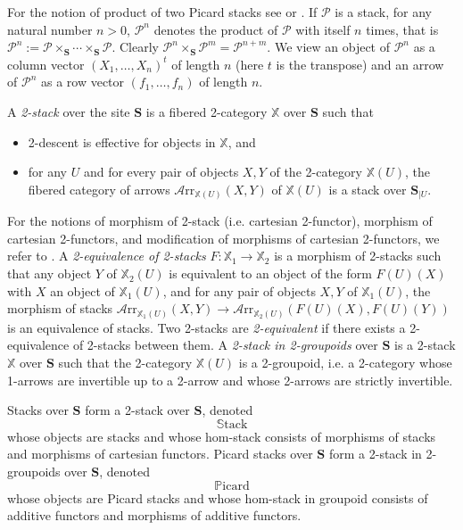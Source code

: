 \documentclass[11pt]{amsart}
\newcommand{\cA}{\mathcal{A}}
\newcommand{\cP}{\mathcal{P}}
\newcommand{\PICARD}{\mathbb{P}\mathrm{icard}}
\newcommand{\STACK}{\mathbb{S}\mathrm{tack}}
\newcommand{\bS}{\textbf{S}}
\newcommand{\twoX}{\mathbb{X}}
\theoremstyle{definition}
\numberwithin{equation}{section}
\begin{document}
For the notion of product of two Picard stacks see \cite[Definition 2.1]{B11} or \cite[Definition 2.1]{BeTa}. If $\cP$ is a stack, for any natural number $n>0$, $\cP^n $ denotes the product of $\cP$ with itself $n$ times, that is $\cP^n:= \cP \times_\bS \cdots \times_\bS  \cP$. Clearly $ \cP^n \times_\bS  \cP^m = \cP^{n+m}.$
We view an object of $\cP^n$ as a column vector $(X_1, \dots , X_n)^t$ of length $n$ (here $t$ is the transpose) and an arrow of $\cP^n$ as a row vector $(f_1, \dots , f_n)$ of length $n$. 

\medskip

A \textit{2-stack} over the site $\bS$ is a fibered 2-category $\twoX$ over $\bS$ such that
\begin{itemize}
	\item  2-descent is effective for objects in $\twoX$, and
	\item  for any $U$ and for every pair of objects $X,Y$ of the 2-category $\twoX(U)$, the fibered category of arrows $\cA\mathrm{rr}_{\twoX(U)}(X,Y)$ of $\twoX(U)$ is a stack over $\bS_{|U}.$
\end{itemize}

For the notions of morphism of 2-stack  (i.e. cartesian 2-functor), morphism of cartesian 2-functors, and modification of morphisms of cartesian 2-functors, we refer to \cite[Chp I]{Hakim}. A \textit{2-equivalence of 2-stacks} $F: \twoX_1 \to \twoX_2$ is a morphism of 2-stacks such that any object $Y $ of $\twoX_2(U)$ is equivalent to an object of the form $F(U)(X)$ with $X$ an object of $\twoX_1(U)$, and for any pair of objects $X,Y  $ of $\twoX_1(U)$, the morphism of stacks 
$\cA\mathrm{rr}_{\twoX_1(U)}(X,Y) \to \cA\mathrm{rr}_{\twoX_2(U)}(F(U)(X),F(U)(Y))$ is an equivalence of stacks.
Two 2-stacks are \textit{2-equivalent} if there exists a 2-equivalence of 2-stacks between them.
 A \textit{2-stack in 2-groupoids} over $\bS$ is a 2-stack $\twoX$ over $\bS$ such that the 2-category $\twoX(U)$ is a 2-groupoid, i.e. a 2-category whose 1-arrows are invertible up to a 2-arrow and whose 2-arrows are strictly invertible.  

\medskip

 Stacks over $\bS$ form a 2-stack over $\bS$, denoted 
$$ \STACK$$
 whose objects are stacks and whose hom-stack consists of morphisms of stacks and morphisms of cartesian functors. Picard stacks over $\bS$ form a 2-stack in 2-groupoids over $\bS$, denoted 
$$\PICARD$$
 whose objects are Picard stacks and whose hom-stack in groupoid consists of additive functors and morphisms of additive functors. 
\end{document}
